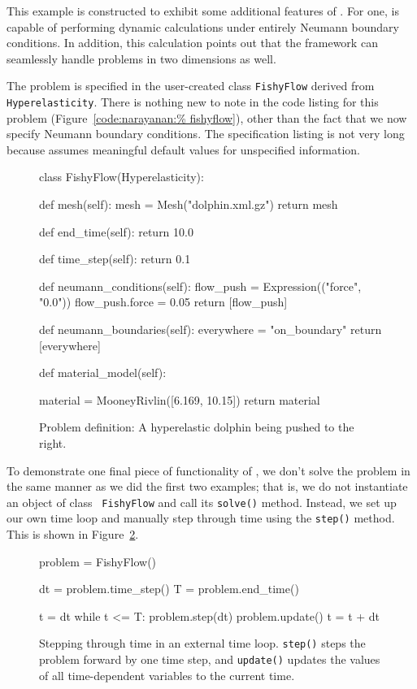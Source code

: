 This example is constructed to exhibit some additional features of
\twist. For one, \twist{} is capable of performing dynamic calculations
under entirely Neumann boundary conditions. In addition, this
calculation points out that the framework can seamlessly handle
problems in two dimensions as well.

The problem is specified in the user-created class {\tt FishyFlow}
derived from {\tt Hyperelasticity}. There is nothing new to note in
the code listing for this problem (Figure~\ref{code:narayanan:%
fishyflow}), other than the fact that we now specify Neumann boundary
conditions. The specification listing is not very long because
\twist{} assumes meaningful default values for unspecified
information.

\begin{figure}[ht]
\begin{python}
class FishyFlow(Hyperelasticity):

    def mesh(self):
        mesh = Mesh("dolphin.xml.gz")
        return mesh

    def end_time(self):
        return 10.0

    def time_step(self):
        return 0.1

    def neumann_conditions(self):
        flow_push = Expression(("force", "0.0"))
        flow_push.force = 0.05
        return [flow_push]

    def neumann_boundaries(self):
        everywhere = "on_boundary"
        return [everywhere]

    def material_model(self):

        material = MooneyRivlin([6.169, 10.15])
        return material
\end{python}
\caption{Problem definition: A hyperelastic dolphin being pushed to
  the right.}
\label{code:narayanan:fishyflow}
\end{figure}

To demonstrate one final piece of functionality of \twist, we don't
solve the problem in the same manner as we did the first two
examples; that is, we do not instantiate an object of class {\tt
  FishyFlow} and call its {\tt solve()} method. Instead, we set up our
own time loop and manually step through time using the {\tt step()}
method. This is shown in Figure~\ref{code:narayanan:manualstep}.

\begin{figure}[ht]
\begin{python}
problem = FishyFlow()

dt = problem.time_step()
T = problem.end_time()

t = dt
while t <= T:
    problem.step(dt)
    problem.update()
    t = t + dt
\end{python}
\caption{Stepping through time in an external time loop. {\tt step()}
  steps the problem forward by one time step, and {\tt update()}
  updates the values of all time-dependent variables to the current time.}
\label{code:narayanan:manualstep}
\end{figure}

